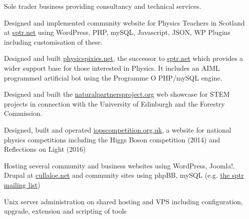 \documentclass[10pt]{article}
\newenvironment{outerlist}[1][\enskip\textbullet]%
        {\begin{itemize}[#1]}{\end{itemize}%
         \vspace{-.6\baselineskip}}
\newenvironment{innerlist}[1][\enskip\textbullet]%
        {\begin{compactitem}[#1]}{\end{compactitem}}
\begin{document}
\begin{outerlist}
\item[]Sole trader business providing consultancy and technical services.

\begin{innerlist}
	\item Designed and implemented community website for Physics Teachers in Scotland at \href{http://sptr.net}{sptr.net} using WordPress, PHP, mySQL, Javascript, JSON, WP Plugins including customisation of these.
	\item Designed and built \href{http://physicspixies.net}{physicspixies.net}, the successor to  \href{http://sptr.net}{sptr.net} which provides a wider support base for those interested in Physics. It includes an AIML programmed artificial bot using the Programme O PHP/mySQL engine.
	\item Designed and built the \href{http://naturalpartnersproject.org/}{naturalpartnersproject.org} web showcase for STEM projects in connection with the University of Edinburgh and the Forestry Commission.
	\item Designed, built and operated \href{http://iopscompetition.org.uk/}{iopscompetition.org.uk}, a website for national physics competitions including the Higgs Boson competition (2014) and Reflections on Light (2016)
	\item Hosting several community and business websites using WordPress, Joomla!, Drupal at \href{http://cullaloe.net}{cullaloe.net} and community sites using phpBB, mySQL (e.g. \href{http://lists.sptr.net/mailman/listinfo}{the sptr mailing list})
	\item Unix server administration on shared hosting and VPS including configuration, upgrade, extension and scripting of tools
\end{innerlist}
\end{outerlist}
%
\end{document}
